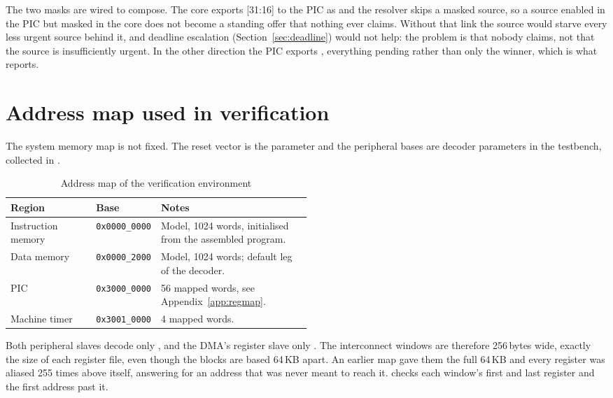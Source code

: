 The two masks are wired to compose. The core exports [31:16] to the PIC
as  and the resolver skips a masked source, so a source enabled
in the PIC but masked in the core does not become a standing offer that nothing
ever claims. Without that link the source would starve every less urgent source
behind it, and deadline escalation (Section~\ref{sec:deadline}) would not help:
the problem is that nobody claims, not that the source is insufficiently urgent.
In the other direction the PIC exports , everything pending
rather than only the winner, which is what  reports.

\section{Address map used in verification}

The system memory map is not fixed. The reset vector is the 
parameter and the peripheral bases are decoder parameters in the testbench,
collected in .

\begin{table}[H]
\centering
\caption{Address map of the verification environment}
\label{tab:memmap}
\begin{tabular}{@{}llL{0.50\linewidth}@{}}
\toprule
\textbf{Region} & \textbf{Base} & \textbf{Notes} \\
\midrule
Instruction memory & \texttt{0x0000\_0000} & Model, 1024 words, initialised from the assembled program. \\
Data memory        & \texttt{0x0000\_2000} & Model, 1024 words; default leg of the decoder. \\
PIC                & \texttt{0x3000\_0000} & 56 mapped words, see Appendix~\ref{app:regmap}. \\
Machine timer      & \texttt{0x3001\_0000} & 4 mapped words. \\
\bottomrule
\end{tabular}
\end{table}

Both peripheral slaves decode only , and the DMA's register slave
only . The interconnect windows are therefore 256\,bytes wide,
exactly the size of each register file, even though the blocks are based
64\,KB apart. An earlier map gave them the full 64\,KB and every register was
aliased 255 times above itself, answering  for an address that was
never meant to reach it.  checks each window's first and last
register and the first address past it.
